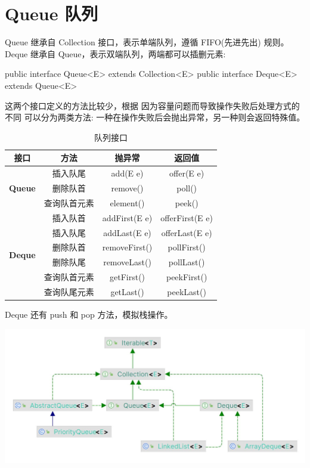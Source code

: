 \section{Queue 队列}

Queue 继承自 Collection 接口，表示单端队列，遵循 FIFO(先进先出) 规则。Deque 继承自 Queue，表示双端队列，两端都可以插删元素:

\begin{Java}
public interface Queue<E> extends Collection<E>
public interface Deque<E> extends Queue<E>
\end{Java}

这两个接口定义的方法比较少，根据 因为容量问题而导致操作失败后处理方式的不同 可以分为两类方法: 一种在操作失败后会抛出异常，另一种则会返回特殊值。

\begin{table}[H]
    \centering
    \small
    \caption{队列接口}
    \label{table:队列接口}
    \setlength{\tabcolsep}{4mm}
    \begin{tabular}{c|c|cc}
        \toprule
        \textbf{接口} & \textbf{方法} & \textbf{抛异常} & \textbf{返回值} \\
        \midrule
        \multirow{3}{*}{\textbf{Queue}} & 插入队尾 & add(E e) & offer(E e) \\
        & 删除队首 & remove() & poll() \\
        & 查询队首元素 & element() & peek() \\
        \midrule
        \multirow{6}{*}{\textbf{Deque}} & 插入队首 & addFirst(E e) & offerFirst(E e) \\
        & 插入队尾 & addLast(E e) & offerLast(E e) \\
        & 删除队首 & removeFirst() & pollFirst() \\
        & 删除队尾 & removeLast() & pollLast() \\
        & 查询队首元素 & getFirst() & peekFirst() \\
        & 查询队尾元素 & getLast() & peekLast() \\
        \bottomrule
    \end{tabular}
\end{table}

Deque 还有 push 和 pop 方法，模拟栈操作。

\begin{center}
    \includegraphics[width=0.7\linewidth]{../../imgs/Queue.jpg}
\end{center}

